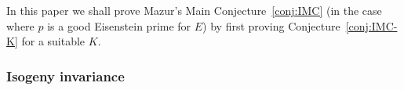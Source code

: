 \documentclass[a4paper,10pt]{amsart}
\numberwithin{equation}{section}
\numberwithin{equation}{section}
\theoremstyle{plain}
\theoremstyle{definition}
\theoremstyle{definition}
\theoremstyle{plain}
\newtheorem{prop}[thm]{Proposition}
\theoremstyle{plain}
\theoremstyle{plain}
\theoremstyle{plain}
\DeclareMathOperator{\ord}{ord}
\newcommand{\Q}{\mathbb{Q}}
\newcommand{\X}{\mathfrak{X}}
\DeclareMathOperator{\ch}{ch}
\newcommand{\Lcal}{\mathcal{L}}
\newcommand{\Fcal}{\mathcal{F}}
\newcommand{\rH}{\mathrm{H}}
\begin{document}

In this paper we shall prove Mazur's Main Conjecture~\ref{conj:IMC} (in the case where $p$ is a good Eisenstein prime for $E$) by first proving  Conjecture~\ref{conj:IMC-K} for a suitable $K$. 


%



\subsubsection{Isogeny invariance}
\end{document}
